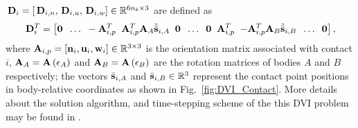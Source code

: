 $\Proj{i}=[\Pn{i}, \Ptu{i}, \Ptw{i} ] \in {\mathbbm{R}}^{6n_b \times 3}$ are defined as
%
\begin{equation}
\begin{gathered}
\Proj{i}^{T} =
\left[ 
{\bf 0} \;\; \ldots \;\; - {\bf A}_{i,p}^T \;\; { {\bf A}_{i,p}^T {\bf{A}}_A {\tilde {\bar {\bf{s}}}}_{i,A}}  
\;\; {\bf 0} \;\;  \ldots  \;\;  {\bf 0} \;\;
{\bf A}_{i,p}^T \;\; { - {\bf A}_{i,p}^T {\bf{A}}_B  {\tilde {\bar {\bf{s}}}}_{i,B}  }  \;\; \ldots \;\;{\bf 0}
\right] ,
\end{gathered} 
\end{equation}
%
where ${\bf{A}}_{i,p} = [\nVec{i}, \uVec{i}, \wVec{i} ] \in {\mathbbm{R}}^{3 \times 3}$ is the orientation matrix associated with contact $i$,
${\bf{A}}_A={\bf{A}}\left({\bf \epsilon}_A\right)$ and ${\bf{A}}_B={\bf{A}}\left({\bf \epsilon}_B\right)$ are the rotation matrices of bodies $A$ and $B$ respectively; the vectors ${\bar {\bf s}}_{i,A}$ and ${\bar {\bf s}}_{i,B} \in {\mathbbm{R}}^{3}$  represent the contact point positions in body-relative coordinates as shown in Fig.~\ref{fig:DVI_Contact}. More details about the solution algorithm, and time-stepping scheme of the this DVI problem may be found in \cite{StTr95,ani04,aniha03}.


